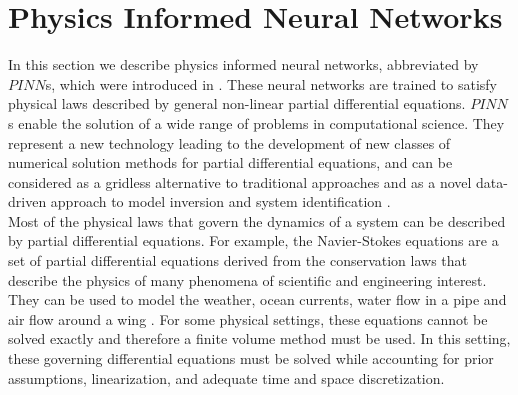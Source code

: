 \section{Physics Informed Neural Networks}
\label{ch1:sec4}

In this section we describe physics informed neural networks, abbreviated by $PINN$s, which were introduced in \cite{RaissiPerdikarisKarniadakisPart1:2017}. These neural networks are trained to satisfy physical laws described by general non-linear partial differential equations. $PINN$s enable the solution of a wide range of problems in computational science. They represent a new technology leading to the development of new classes of numerical solution methods for partial differential equations, and can be considered as a gridless alternative to traditional approaches and as a novel data-driven approach to model inversion and system identification \cite[p.~3]{RaissiPerdikarisKarniadakis:2019}. \\
Most of the physical laws that govern the dynamics of a system can be described by partial differential equations. For example, the Navier-Stokes equations are a set of partial differential equations derived from the conservation laws that describe the physics of many phenomena of scientific and engineering interest. They can be used to model the weather, ocean currents, water flow in a pipe and air flow around a wing \cite[p.~15]{RaissiPerdikarisKarniadakis:2019}. For some physical settings, these equations cannot be solved exactly and therefore a finite volume method must be used. In this setting, these governing differential equations must be solved while accounting for prior assumptions, linearization, and adequate time and space discretization. \\

